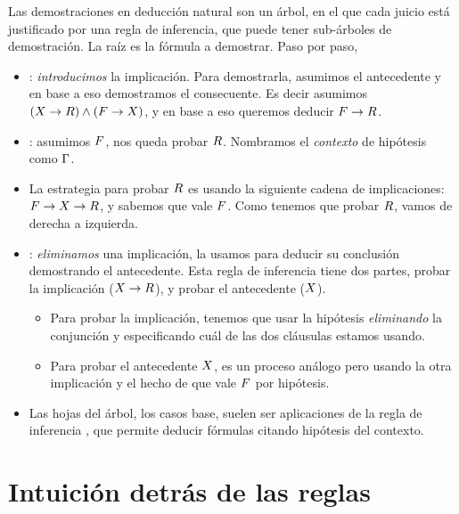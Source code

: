 \begin{ejemplo}
    Las demostraciones en deducción natural son un árbol, en el que cada juicio está justificado por una regla de inferencia, que puede tener sub-árboles de demostración. La raíz es la fórmula a demostrar. Paso por paso,

    \begin{itemize}
        \item {}: \textit{introducimos} la implicación. Para demostrarla,
        asumimos el antecedente y en base a eso demostramos el consecuente. Es
        decir asumimos $(X \to R) \wedge (F \to
        X)$, y en base a eso queremos deducir $F \to R$.
        \item {}: asumimos $F$, nos queda probar $R$.
        Nombramos el \textit{contexto} de hipótesis como $\Gamma$.
        \item La estrategia para probar $R$ es usando la siguiente cadena
        de implicaciones: $F \to X \to R$, y sabemos que
        vale $F$. Como tenemos que probar $R$, vamos de derecha a izquierda.
        \item {}: \textit{eliminamos} una implicación, la usamos para
        deducir su conclusión demostrando el antecedente. Esta regla de
        inferencia tiene dos partes, probar la implicación ($X \to
        R$), y probar el antecedente ($X$).
        \begin{itemize}
            \item Para probar la implicación, tenemos que usar la hipótesis \textit{eliminando} la conjunción y especificando cuál
            de las dos cláusulas estamos usando.
            \item Para probar el antecedente $X$, es un proceso análogo
            pero usando la otra implicación y el hecho de que vale $F$ por hipótesis.
        \end{itemize}
        \item Las hojas del árbol, los casos base, suelen ser aplicaciones de
        la regla de inferencia , que permite deducir fórmulas citando
        hipótesis del contexto.
    \end{itemize}
\end{ejemplo}

\section{Intuición detrás de las reglas}

